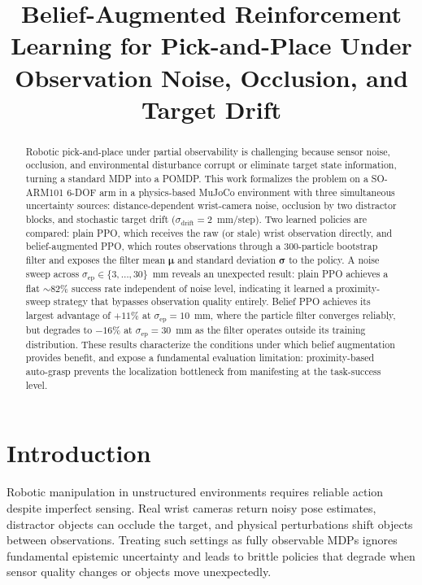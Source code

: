 \documentclass[conference]{IEEEtran}
\title{Belief-Augmented Reinforcement Learning for Pick-and-Place
       Under Observation Noise, Occlusion, and Target Drift}
\author{
  \IEEEauthorblockN{Allen Devaraj Augustin Ponraj}
  \IEEEauthorblockA{
    Department of Aerospace Engineering Sciences\\
    University of Colorado Boulder\\
    allendevaraj.augustinponraj@colorado.edu
  }
}
\newcommand{\sigmaep}{\sigma_{\text{ep}}}
\newcommand{\sdrift}{\sigma_{\text{drift}}}
\begin{document}
\maketitle

\begin{abstract}
Robotic pick-and-place under partial observability is challenging because
sensor noise, occlusion, and environmental disturbance corrupt or eliminate
target state information, turning a standard MDP into a POMDP.
This work formalizes the problem on a SO-ARM101 6-DOF arm in a physics-based
MuJoCo environment with three simultaneous uncertainty sources:
distance-dependent wrist-camera noise, occlusion by two distractor blocks,
and stochastic target drift ($\sdrift = 2$~mm/step).
Two learned policies are compared: plain PPO, which receives the raw (or
stale) wrist observation directly, and belief-augmented PPO, which routes
observations through a 300-particle bootstrap filter and exposes the filter
mean $\bm{\mu}$ and standard deviation $\bm{\sigma}$ to the policy.
A noise sweep across $\sigmaep \in \{3,\ldots,30\}$~mm reveals an unexpected
result: plain PPO achieves a flat $\sim\!82\%$ success rate independent of
noise level, indicating it learned a proximity-sweep strategy that bypasses
observation quality entirely.
Belief PPO achieves its largest advantage of $+11\%$ at $\sigmaep = 10$~mm,
where the particle filter converges reliably, but degrades to $-16\%$ at
$\sigmaep = 30$~mm as the filter operates outside its training distribution.
These results characterize the conditions under which belief augmentation
provides benefit, and expose a fundamental evaluation limitation:
proximity-based auto-grasp prevents the localization bottleneck from
manifesting at the task-success level.
\end{abstract}

\section{Introduction}
\label{sec:intro}

Robotic manipulation in unstructured environments requires reliable action
despite imperfect sensing.
Real wrist cameras return noisy pose estimates, distractor objects can
occlude the target, and physical perturbations shift objects between
observations.
Treating such settings as fully observable MDPs ignores fundamental epistemic
uncertainty and leads to brittle policies that degrade when sensor quality
changes or objects move unexpectedly.
\end{document}
